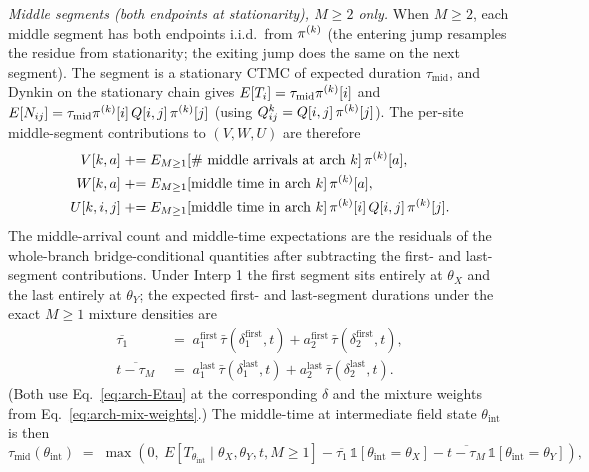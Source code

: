 \emph{Middle segments (both endpoints at stationarity), $M \geq 2$
only.} When $M \geq 2$, each middle segment has both endpoints
i.i.d.\ from $\pi^{(k)}$ (the entering jump resamples the residue
from stationarity; the exiting jump does the same on the next
segment). The segment is a stationary CTMC of expected duration
$\tau_{\mathrm{mid}}$, and Dynkin on the stationary chain gives
$E[T_i] = \tau_{\mathrm{mid}} \pi^{(k)}[i]$ and
$E[N_{ij}] = \tau_{\mathrm{mid}} \pi^{(k)}[i]\, Q[i, j]\,
\pi^{(k)}[j]$ (using $Q^{k}_{ij} = Q[i, j]\, \pi^{(k)}[j]$).
The per-site middle-segment contributions to $(V, W, U)$ are
therefore
\begin{align}
  V[k, a]     &\mathrel{+}= E_{M\geq 1}[\#\ \text{middle arrivals at arch }k]\, \pi^{(k)}[a],
  \label{eq:arch-mid-V} \\
  W[k, a]     &\mathrel{+}= E_{M\geq 1}[\text{middle time in arch }k]\, \pi^{(k)}[a],
  \label{eq:arch-mid-W} \\
  U[k, i, j]  &\mathrel{+}= E_{M\geq 1}[\text{middle time in arch }k]\, \pi^{(k)}[i]\,
                            Q[i, j]\,\pi^{(k)}[j].
  \label{eq:arch-mid-U}
\end{align}
The middle-arrival count and middle-time expectations are the
residuals of the whole-branch bridge-conditional quantities after
subtracting the first- and last-segment contributions. Under Interp 1
the first segment sits entirely at $\theta_X$ and the last entirely at
$\theta_Y$; the expected first- and last-segment durations under the
exact $M \geq 1$ mixture densities are
\begin{align}
  \overline{\tau_1}
  &\;=\; a_1^{\text{first}}\, \bar\tau(\delta_1^{\text{first}}, t)
        + a_2^{\text{first}}\, \bar\tau(\delta_2^{\text{first}}, t),
  \label{eq:arch-Etau1-mix} \\
  \overline{t - \tau_M}
  &\;=\; a_1^{\text{last}}\, \bar\tau(\delta_1^{\text{last}}, t)
        + a_2^{\text{last}}\, \bar\tau(\delta_2^{\text{last}}, t).
  \label{eq:arch-EtauM-mix}
\end{align}
(Both use Eq.~\ref{eq:arch-Etau} at the corresponding $\delta$ and the
mixture weights from Eq.~\ref{eq:arch-mix-weights}.) The middle-time
at intermediate field state $\theta_{\text{int}}$ is then
\begin{equation}
  \tau_{\text{mid}}(\theta_{\text{int}})
  \;=\;
  \max\!\left(0,\
    E[T_{\theta_{\text{int}}} \mid \theta_X, \theta_Y, t, M \geq 1]
    - \overline{\tau_1}\, \mathbb{1}[\theta_{\text{int}} = \theta_X]
    - \overline{t - \tau_M}\, \mathbb{1}[\theta_{\text{int}} = \theta_Y]
  \right),
  \label{eq:arch-taumid}
\end{equation}
